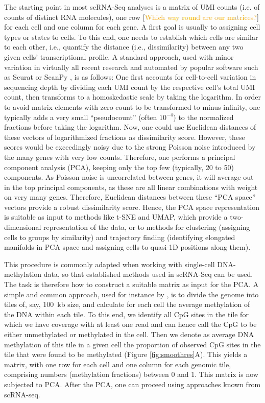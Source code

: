 \documentclass[twocolumn,10pt]{article}
\newcommand{\todo}[1]{[\textcolor{orange}{#1}]}
\begin{document}
The starting point in most scRNA-Seq analyses is a matrix of UMI counts (i.e. of counts of distinct RNA molecules), one row \todo{Which way round are our matrices?} for each cell and one column for each gene. A first goal is usually to assigning cell types or states to cells. To this end, one needs to establish which cells are similar to each other, i.e., quantify the distance (i.e., dissimilarity) between any two given cells' transcriptional profile. A standard approach, used with minor variation in virtually all recent research and automated by popular software such as Seurat \citep{Hao_2021} or ScanPy \citep{Wolf_2018}, is as follows: One first accounts for cell-to-cell variation in sequencing depth by dividing each UMI count by the respective cell's total UMI count, then transforms to a homoskedastic scale by taking the logarithm. In order to avoid matrix elements with zero count to be transformed to minus infinity, one typically adds a very small ``pseudocount'' (often $10^{-4}$) to the normalized fractions before taking the logarithm. Now, one could use Euclidean distances of these vectors of logarithmized fractions as dissimilarity score. However, these scores would be exceedingly noisy due to the strong Poisson noise introduced by the many genes with very low counts. Therefore, one performs a principal component analysis (PCA), keeping only the top few (typically, 20 to 50) components. As Poisson noise is uncorrelated between genes, it will average out in the top principal components, as these are all linear combinations with weight on very many genes. Therefore, Euclidean distances between these ``PCA space'' vectors provide a robust dissimilarity score. Hence, the PCA space representation is suitable as input to methods like t-SNE and UMAP, which provide a two-dimensional representation of the data, or to methods for clustering (assigning cells to groups by similarity) and trajectory finding (identifying elongated manifolds in PCA space and assigning cells to quasi-1D positions along them).

This procedure is commonly adapted when working with single-cell DNA-methylation data, so that established methods used in scRNA-Seq can be used.
The task is therefore how to construct a suitable matrix as input for the PCA. A simple and common approach, used for instance by \citet{luo2017single}, is to divide the genome into tiles of, say, 100~kb size, and calculate for each cell the average methylation of the DNA within each tile. To this end, we identify all CpG sites in the tile for which we have coverage with at least one read and can hence call the CpG to be either unmethylated or methylated in the cell. Then we denote as average DNA methylation of this tile in a given cell the proportion of observed CpG sites in the tile that were found to be methylated (Figure \ref{fig:smoothres}A). This yields a matrix, with one row for each cell and one column for each genomic tile, comprising numbers (methylation fractions) between 0 and 1. This matrix is now subjected to PCA. After the PCA, one can proceed using approaches known from scRNA-seq.
\end{document}

